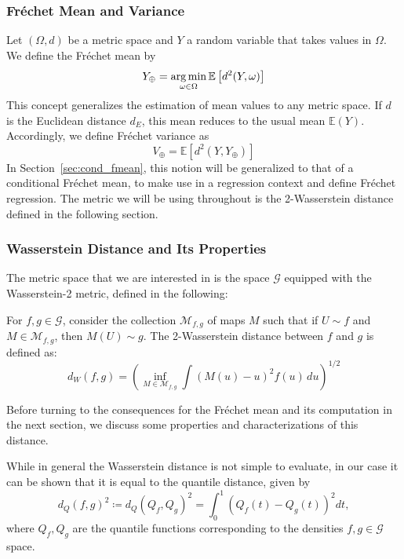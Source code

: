 \subsubsection{Fréchet Mean and Variance}
\label{sec:f_mean}
Let $(\Omega, d)$ be a metric space and $Y$ a random variable that takes values in
$\Omega$. We define the Fréchet mean by
\begin{equation}
    Y_\oplus = \operatorname*{arg\,min}_{\omega \in \Omega} \mathbb{E} \left[ d^2(Y, \omega) \right]
    \label{eq:fmean}
\end{equation}
This concept generalizes the estimation of mean values to any metric space. If $d$ is
the Euclidean distance $d_E$, this mean reduces to the usual mean $\mathbb{E}(Y)$. Accordingly,
we define Fréchet variance as
\begin{equation}
    V_\oplus = \mathbb{E} \left[ d^2(Y, Y_\oplus) \right]
    \label{eq:fvar}
\end{equation}
In Section~\ref{sec:cond_fmean}, this notion will be generalized to that of a conditional
Fréchet mean, to make use in a regression context and define Fréchet regression. The metric
we will be using throughout is the 2-Wasserstein distance defined in the following section.

\subsubsection{Wasserstein Distance and Its Properties}
\label{sec:wasserstein_distance}
The metric space that we are interested in is the space $\mathcal{G}$ equipped with the
Wasserstein-2 metric, defined in the following:
\begin{definition}
    \label{def:wasserstein_2_dist}
    For \( f, g \in \mathcal{G} \), consider the collection \( \mathcal{M}_{f,g} \) of maps \( M \)
    such that if \( U \sim f \) and \( M \in \mathcal{M}_{f,g} \), then \( M(U) \sim g \).
    The 2-Wasserstein distance between \( f \) and \( g \) is defined as:
    \[
    d_W(f, g) = \left( \inf_{M \in \mathcal{M}_{f,g}} \int (M(u) - u)^2 f(u) \, du \right)^{1/2}
    \]
\end{definition}
Before turning to the consequences for the Fréchet mean and its computation in the next section,
we discuss some properties and characterizations of this distance.

While in general the Wasserstein distance is not simple to evaluate, in our case it can
be shown that it is equal to the quantile distance, given by
\[
d_Q(f, g)^2 \coloneqq d_Q(Q_f, Q_g)^2 = \int_{0}^{1} (Q_f(t) - Q_g(t))^2 dt,
\]
where $Q_f, Q_g$ are the quantile functions corresponding to the densities $f, g \in \mathcal{G}$ space.

